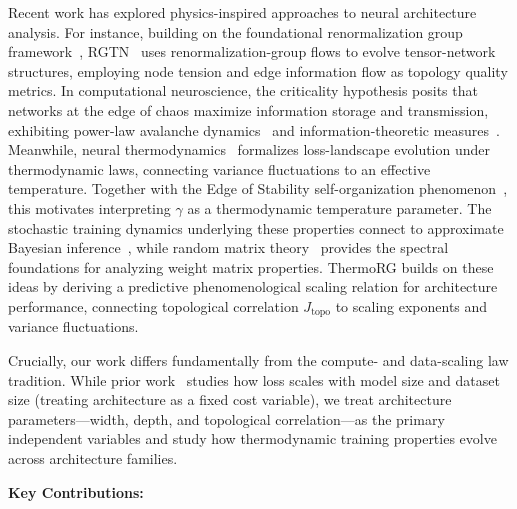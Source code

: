 \documentclass[11pt, a4paper]{article}
\theoremstyle{plain}
\begin{document}
Recent work has explored physics-inspired approaches to neural architecture analysis. For instance, building on the foundational renormalization group framework~\citep{wilson1974renormalization}, RGTN~\citep{rg-tn-2026} uses renormalization-group flows to evolve tensor-network structures, employing node tension and edge information flow as topology quality metrics. In computational neuroscience, the criticality hypothesis posits that networks at the edge of chaos maximize information storage and transmission, exhibiting power-law avalanche dynamics~\citep{beggs2003neuronal} and information-theoretic measures~\citep{criticality-neuroscience}. Meanwhile, neural thermodynamics~\citep{edge-of-stability-2025} formalizes loss-landscape evolution under thermodynamic laws, connecting variance fluctuations to an effective temperature. Together with the Edge of Stability self-organization phenomenon~\citep{cohen2021theory}, this motivates interpreting $\gamma$ as a thermodynamic temperature parameter. The stochastic training dynamics underlying these properties connect to approximate Bayesian inference~\citep{mandt2017stochastic}, while random matrix theory~\citep{marchenko1967distribution} provides the spectral foundations for analyzing weight matrix properties. ThermoRG builds on these ideas by deriving a predictive phenomenological scaling relation for architecture performance, connecting topological correlation $J_{\mathrm{topo}}$ to scaling exponents and variance fluctuations.

Crucially, our work differs fundamentally from the compute- and data-scaling law tradition. While prior work~\citep{kaplan2020scaling,hoffmann2022training} studies how loss scales with model size and dataset size (treating architecture as a fixed cost variable), we treat architecture parameters---width, depth, and topological correlation---as the primary independent variables and study how thermodynamic training properties evolve across architecture families.

\medskip
\noindent\textbf{Key Contributions:}
\end{document}
